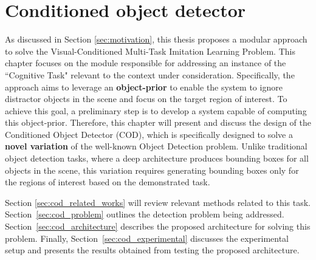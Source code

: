 \chapter{Conditioned object detector}
\label{ch:cod}
As discussed in Section \ref{sec:motivation}, this thesis proposes a modular approach to solve the Visual-Conditioned Multi-Task Imitation Learning Problem. This chapter focuses on the module responsible for addressing an instance of the ``Cognitive Task" relevant to the context under consideration. Specifically, the approach aims to leverage an \textbf{object-prior} to enable the system to ignore distractor objects in the scene and focus on the target region of interest. To achieve this goal, a preliminary step is to develop a system capable of computing this object-prior. Therefore, this chapter will present and discuss the design of the Conditioned Object Detector (COD), which is specifically designed to solve a \textbf{novel variation} of the well-known Object Detection problem. Unlike traditional object detection tasks, where a deep architecture produces bounding boxes for all objects in the scene, this variation requires generating bounding boxes only for the regions of interest based on the demonstrated task.

Section \ref{sec:cod_related_works} will review relevant methods related to this task. 
Section~\ref{sec:cod_problem} outlines the detection problem being addressed. Section~\ref{sec:cod_architecture} describes the proposed architecture for solving this problem. Finally, Section~\ref{sec:cod_experimental} discusses the experimental setup and presents the results obtained from testing the proposed architecture.




